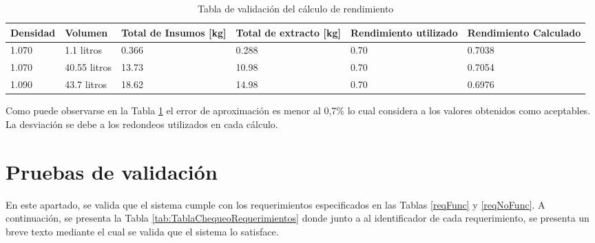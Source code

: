 \begin{table}[H]
    \centering
    \begin{tabularx}{\textwidth}{|X|X|X|X|X|X|}
        \hline
        Densidad & Volumen & Total de Insumos [kg] & Total de extracto [kg] & Rendimiento utilizado & Rendimiento Calculado \\
        \hline
        \hline
        1.070 & 1.1 litros & 0.366 & 0.288 & 0.70 & 0.7038\\ \hline
        1.070 & 40.55 litros & 13.73 & 10.98 & 0.70 & 0.7054 \\ \hline
        1.090 & 43.7 litros & 18.62 & 14.98 & 0.70 & 0.6976 \\ \hline
    \end{tabularx}
    \caption{Tabla de validación del cálculo de rendimiento}
    \label{tab:rendimiento}
\end{table}

\par Como puede observarse en la Tabla \ref{tab:rendimiento} el error de aproximación es menor al 0,7\% lo cual considera a los valores obtenidos como aceptables. La desviación se debe a los redondeos utilizados en cada cálculo. 

\section{Pruebas de validación}
 \par En este apartado, se valida que el sistema cumple con los requerimientos especificados en las Tablas \ref{reqFunc} y \ref{reqNoFunc}. A continuación, se presenta la Tabla \ref{tab:TablaChequeoRequerimientos} donde junto a al identificador de cada requerimiento, se presenta un breve texto mediante el cual se valida que el sistema lo satisface.

